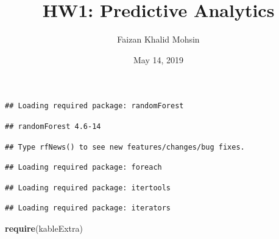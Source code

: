 \documentclass[]{article}
\title{HW1: Predictive Analytics}
\author{Faizan Khalid Mohsin}
\date{May 14, 2019}
\newenvironment{Shaded}{\begin{snugshade}}{\end{snugshade}}
\newcommand{\KeywordTok}[1]{\textcolor[rgb]{0.13,0.29,0.53}{\textbf{#1}}}
\newcommand{\DataTypeTok}[1]{\textcolor[rgb]{0.13,0.29,0.53}{#1}}
\newcommand{\StringTok}[1]{\textcolor[rgb]{0.31,0.60,0.02}{#1}}
\newcommand{\CommentTok}[1]{\textcolor[rgb]{0.56,0.35,0.01}{\textit{#1}}}
\newcommand{\OtherTok}[1]{\textcolor[rgb]{0.56,0.35,0.01}{#1}}
\newcommand{\OperatorTok}[1]{\textcolor[rgb]{0.81,0.36,0.00}{\textbf{#1}}}
\newcommand{\NormalTok}[1]{#1}
\begin{document}
\maketitle

\begin{Shaded}
\end{Shaded}

\begin{verbatim}
## Loading required package: randomForest
\end{verbatim}

\begin{verbatim}
## randomForest 4.6-14
\end{verbatim}

\begin{verbatim}
## Type rfNews() to see new features/changes/bug fixes.
\end{verbatim}

\begin{verbatim}
## Loading required package: foreach
\end{verbatim}

\begin{verbatim}
## Loading required package: itertools
\end{verbatim}

\begin{verbatim}
## Loading required package: iterators
\end{verbatim}

\begin{Shaded}
\begin{Highlighting}[]
\KeywordTok{require}\NormalTok{(kableExtra)}
\end{Highlighting}
\end{Shaded}
\end{document}

